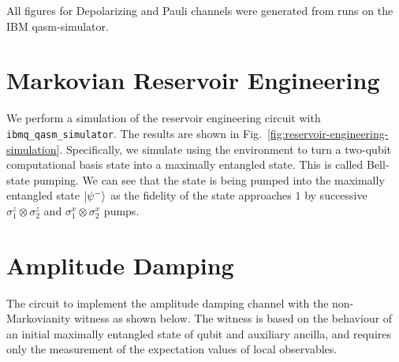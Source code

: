 \documentclass[12pt]{article}
\DeclarePairedDelimiter{\ket}{\lvert}{\rangle}
\begin{document}
  All figures for Depolarizing and Pauli channels were generated from runs on the IBM qasm-simulator.

  \section{Markovian Reservoir Engineering}
  We perform a simulation of the reservoir engineering circuit with \texttt{ibmq\_qasm\_simulator}. The results are shown in Fig.~\ref{fig:reservoir-engineering-simulation}. Specifically, we simulate using the environment to turn a two-qubit computational basis state into a maximally entangled state. This is called Bell-state pumping. We can see that the state is being pumped into the maximally entangled state \( \ket{\psi^{-}} \) as the fidelity of the state approaches \( 1 \) by successive \( \sigma^{z}_{1} \otimes \sigma^{z}_{2} \) and \( \sigma^{x}_{1} \otimes \sigma^{x}_{2} \) pumps.

  \section{Amplitude Damping}
  The circuit to implement the amplitude damping channel with the non-Markovianity witness as shown below. The witness is based on the behaviour of an initial maximally entangled state of qubit and auxiliary ancilla, and requires only the measurement of the expectation values of local observables.
\end{document}
